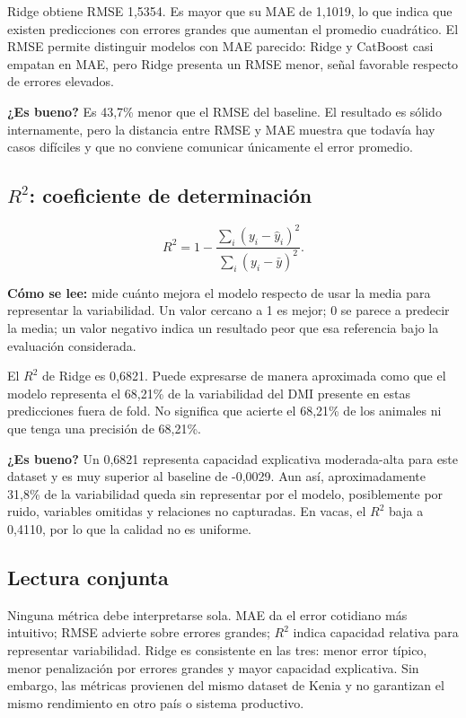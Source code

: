 \documentclass[11pt,a4paper]{article}
\begin{document}
Ridge obtiene RMSE 1,5354. Es mayor que su MAE de 1,1019, lo que indica que existen predicciones con errores grandes que aumentan el promedio cuadrático. El RMSE permite distinguir modelos con MAE parecido: Ridge y CatBoost casi empatan en MAE, pero Ridge presenta un RMSE menor, señal favorable respecto de errores elevados.

\textbf{¿Es bueno?} Es 43,7\% menor que el RMSE del baseline. El resultado es sólido internamente, pero la distancia entre RMSE y MAE muestra que todavía hay casos difíciles y que no conviene comunicar únicamente el error promedio.

\subsection{$R^2$: coeficiente de determinación}

\begin{equation}
R^2=1-\frac{\sum_i(y_i-\hat y_i)^2}{\sum_i(y_i-\bar y)^2}.
\end{equation}

\textbf{Cómo se lee:} mide cuánto mejora el modelo respecto de usar la media para representar la variabilidad. Un valor cercano a 1 es mejor; 0 se parece a predecir la media; un valor negativo indica un resultado peor que esa referencia bajo la evaluación considerada.

El $R^2$ de Ridge es 0,6821. Puede expresarse de manera aproximada como que el modelo representa el 68,21\% de la variabilidad del DMI presente en estas predicciones fuera de fold. No significa que acierte el 68,21\% de los animales ni que tenga una precisión de 68,21\%.

\textbf{¿Es bueno?} Un 0,6821 representa capacidad explicativa moderada-alta para este dataset y es muy superior al baseline de -0,0029. Aun así, aproximadamente 31,8\% de la variabilidad queda sin representar por el modelo, posiblemente por ruido, variables omitidas y relaciones no capturadas. En vacas, el $R^2$ baja a 0,4110, por lo que la calidad no es uniforme.

\subsection{Lectura conjunta}

Ninguna métrica debe interpretarse sola. MAE da el error cotidiano más intuitivo; RMSE advierte sobre errores grandes; $R^2$ indica capacidad relativa para representar variabilidad. Ridge es consistente en las tres: menor error típico, menor penalización por errores grandes y mayor capacidad explicativa. Sin embargo, las métricas provienen del mismo dataset de Kenia y no garantizan el mismo rendimiento en otro país o sistema productivo.
\end{document}

